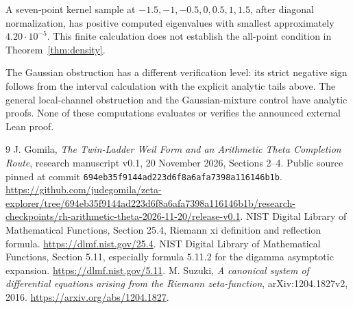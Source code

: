\documentclass[11pt,letterpaper]{article}
\theoremstyle{remark}\newtheorem{remark}[theorem]{Remark}
\numberwithin{equation}{section}
\begin{document}
A seven-point kernel sample at $-1.5,-1,-0.5,0,0.5,1,1.5$, after diagonal normalization, has positive computed eigenvalues with smallest approximately $4.20\cdot10^{-5}$. This finite calculation does not establish the all-point condition in Theorem~\ref{thm:density}.

The Gaussian obstruction has a different verification level: its strict negative sign follows from the interval calculation with the explicit analytic tails above. The general local-channel obstruction and the Gaussian-mixture control have analytic proofs. None of these computations evaluates or verifies the announced external Lean proof.

\begin{thebibliography}{9}
 J. Gomila, \emph{The Twin-Ladder Weil Form and an Arithmetic Theta Completion Route}, research manuscript v0.1, 20 November 2026, Sections 2--4. Public source pinned at commit \texttt{694eb35f9144ad223d6f8a6afa7398a116146b1b}. \url{https://github.com/judegomila/zeta-explorer/tree/694eb35f9144ad223d6f8a6afa7398a116146b1b/research-checkpoints/rh-arithmetic-theta-2026-11-20/release-v0.1}.
 NIST Digital Library of Mathematical Functions, Section 25.4, Riemann xi definition and reflection formula. \url{https://dlmf.nist.gov/25.4}.
 NIST Digital Library of Mathematical Functions, Section 5.11, especially formula 5.11.2 for the digamma asymptotic expansion. \url{https://dlmf.nist.gov/5.11}.
 M. Suzuki, \emph{A canonical system of differential equations arising from the Riemann zeta-function}, arXiv:1204.1827v2, 2016. \url{https://arxiv.org/abs/1204.1827}.
\end{thebibliography}
\end{document}
